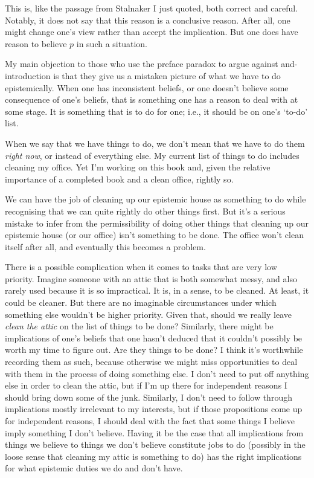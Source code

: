 \documentclass[11pt,]{book}
\begin{document}
This is, like the passage from Stalnaker I just quoted, both correct and careful. Notably, it does not say that this reason is a conclusive reason. After all, one might change one's view rather than accept the implication. But one does have reason to believe \(p\) in such a situation.

My main objection to those who use the preface paradox to argue against and-introduction is that they give us a mistaken picture of what we have to do epistemically. When one has inconsistent beliefs, or one doesn't believe some consequence of one's beliefs, that is something one has a reason to deal with at some stage. It is something that is to do for one; i.e., it should be on one's `to-do' list.

When we say that we have things to do, we don't mean that we have to do them \emph{right now}, or instead of everything else. My current list of things to do includes cleaning my office. Yet I'm working on this book and, given the relative importance of a completed book and a clean office, rightly so.

We can have the job of cleaning up our epistemic house as something to do while recognising that we can quite rightly do other things first. But it's a serious mistake to infer from the permissibility of doing other things that cleaning up our epistemic house (or our office) isn't something to be done. The office won't clean itself after all, and eventually this becomes a problem.

There is a possible complication when it comes to tasks that are very low priority. Imagine someone with an attic that is both somewhat messy, and also rarely used because it is so impractical. It is, in a sense, to be cleaned. At least, it could be cleaner. But there are no imaginable circumstances under which something else wouldn't be higher priority. Given that, should we really leave \emph{clean the attic} on the list of things to be done? Similarly, there might be implications of one's beliefs that one hasn't deduced that it couldn't possibly be worth my time to figure out. Are they things to be done? I think it's worthwhile recording them as such, because otherwise we might miss opportunities to deal with them in the process of doing something else. I don't need to put off anything else in order to clean the attic, but if I'm up there for independent reasons I should bring down some of the junk. Similarly, I don't need to follow through implications mostly irrelevant to my interests, but if those propositions come up for independent reasons, I should deal with the fact that some things I believe imply something I don't believe. Having it be the case that all implications from things we believe to things we don't believe constitute jobs to do (possibly in the loose sense that cleaning my attic is something to do) has the right implications for what epistemic duties we do and don't have.
\end{document}
